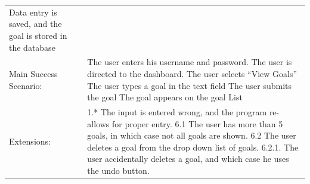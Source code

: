 \documentclass[10pt]{article}
\begin{document}
\begin{longtable}[]{@{}ll@{}}
\begin{minipage}[t]{0.47\columnwidth}
Data entry is saved, and the goal is stored in the database\strut
\end{minipage}\tabularnewline
\begin{minipage}[t]{0.48\columnwidth}\raggedright\strut
Main Success Scenario:\strut
\end{minipage} & \begin{minipage}[t]{0.48\columnwidth}\raggedright\strut
The user enters his username and password. The user is directed to the
dashboard. The user selects ``View Goals'' The user types a goal in the
text field The user submits the goal The goal appears on the goal
List\strut
\end{minipage}\tabularnewline
\begin{minipage}[t]{0.48\columnwidth}\raggedright\strut
Extensions:\strut
\end{minipage} & \begin{minipage}[t]{0.48\columnwidth}\raggedright\strut
1.* The input is entered wrong, and the program re-allows for proper
entry. 6.1 The user has more than 5 goals, in which case not all goals
are shown. 6.2 The user deletes a goal from the drop down list of goals.
6.2.1. The user accidentally deletes a goal, and which case he uses the
undo button.\strut
\end{minipage}\tabularnewline
\bottomrule
\end{longtable}
\end{document}
